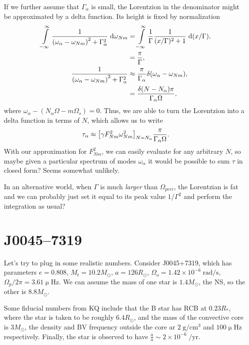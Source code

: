 \documentclass[11pt,
        usenames, %
        dvipsnames %
    ]{article}
\newcommand*{\scinot}[2]{#1\times10^{#2}}
\DeclarePairedDelimiter\p{\lparen}{\rparen}
\DeclarePairedDelimiter\s{\lbrack}{\rbrack}
\begin{document}
If we further assume that $\Gamma_{\alpha}$ is small, the Lorentzion in the
denominator might be approximated by a delta function. Its height is fixed by
normalization
\begin{align}
    \int\limits_{-\infty}^\infty \frac{1}{\p*{\omega_\alpha - \omega_{Nm}}^2
            + \Gamma_\alpha^2}\;\mathrm{d}\omega_{Nm}
        &= \int\limits_{-\infty}^\infty \frac{1}{\Gamma}
            \frac{1}{(x/\Gamma)^2 + 1}\;\mathrm{d}(x/\Gamma),\\
        &= \frac{\pi}{\Gamma},\\
    \frac{1}{\p*{\omega_\alpha - \omega_{Nm}}^2 + \Gamma_\alpha^2}
        &\approx \frac{\pi}{\Gamma_\alpha}\delta\p*{\omega_\alpha - \omega_{Nm}}
            ,\\
        &= \frac{\delta\p*{N - N_\alpha}\pi}{\Gamma_\alpha\Omega},
\end{align}
where $\omega_\alpha - (N_\alpha \Omega - m\Omega_s) = 0$. Thus, we are able to
turn the Lorentzion into a delta function in terms of $N$, which allows us to
write
\begin{equation}
    \tau_\alpha \approx \s*{\gamma F_{Nm}^2 \omega_{Nm}^2}_{N = N_\alpha}
        \frac{\pi}{\Gamma_\alpha \Omega}.
\end{equation}
With our approximation for $F_{Nm}^2$, we can easily evaluate for any arbitrary
$N$, so maybe given a particular spectrum of modes $\omega_\alpha$ it would be
possible to sum $\tau$ in closed form? Seems somewhat unlikely.

In an alternative world, when $\Gamma$ is much \emph{larger} than
$\Omega_{peri}$, the Lorentzian is fat and we can probably just set it equal to
its peak value $1/\Gamma^2$ and perform the integration as usual?

\section{J0045--7319}

Let's try to plug in some realistic numbers. Consider J0045+7319, which has
parameters $e = 0.808$, $M_t = 10.2M_{\odot}$, $a = 126R_{\odot}$, $\Omega_o =
\scinot{1.42}{-6}\;\mathrm{rad/s}$, $\Omega_p/2\pi = 3.61\upmu\mathrm{Hz}$. We
can assume the mass of one star is $1.4M_{\odot}$, the NS, so the other is
$8.8M_{\odot}$.

Some fiducial numbers from KQ include that the B star has RCB at $0.23R_*$,
where the star is taken to be roughly $6.4R_{\odot}$, and the mass of the
convective core is $3M_{\odot}$, the density and BV frequency outside the core
ar $2\;\mathrm{g/cm^3}$ and $100\upmu\mathrm{Hz}$ respectively. Finally, the
star is observed to have $\frac{\dot{a}}{a} \sim \scinot{2}{-6}\;\mathrm{/yr}$.
\end{document}
